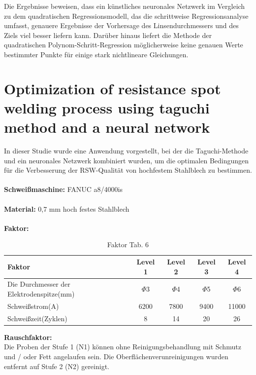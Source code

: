 \documentclass[english,ngerman]{tudscrreprt}
\begin{document}
Die Ergebnisse beweisen, dass ein künstliches neuronales Netzwerk im Vergleich zu dem quadratischen Regressionsmodell, das die schrittweise Regressionsanalyse umfasst, genauere Ergebnisse der Vorhersage des Linsendurchmessers und des Ziels viel besser liefern kann. Darüber hinaus liefert die Methode der quadratischen Polynom-Schritt-Regression möglicherweise keine genauen Werte bestimmter Punkte für einige stark nichtlineare Gleichungen.
\newpage

\section{Optimization of resistance spot welding process using taguchi method and a neural network\cite{Lin.}}
In dieser Studie wurde eine Anwendung vorgestellt, bei der die Taguchi-Methode und ein neuronales Netzwerk kombiniert wurden, um die optimalen Bedingungen für die Verbesserung der RSW-Qualität von hochfestem Stahlblech zu bestimmen.\\
\\
\textbf{Schweißmaschine: }FANUC a8/4000is\\
\\
\textbf{Material: }0,7 mm hoch festes Stahlblech\\
\\
\textbf{Faktor: }\\
\begin{table}[H]
\caption{Faktor Tab. 6}
\begin{flushleft}
	\begin{tabular}{lcccc} 
		\toprule
 		\textbf{Faktor} & \textbf{Level 1 } & \textbf{Level 2}&\textbf{Level 3}&\textbf{Level 4}\\
		\midrule
		Die Durchmesser der Elektrodenspitze(mm) & $\Phi$3 & $\Phi$4 & $\Phi$5 & $\Phi$6\\

		Schweißstrom(A) & 6200  & 7800 & 9400 & 11000\\

		Schweißzeit(Zyklen) & 8 & 14 & 20 & 26\\
		\bottomrule
	\end{tabular}
\end{flushleft}
\end{table}
\noindent
\textbf{Rauschfaktor: }\\
Die Proben der Stufe 1 (N1) können ohne Reinigungsbehandlung mit Schmutz und / oder Fett angelaufen sein. Die Oberflächenverunreinigungen wurden entfernt auf Stufe 2 (N2) gereinigt.\\
\end{document}
